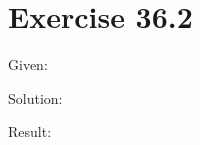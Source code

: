 \documentclass[a4paper, 10pt]{scrartcl}
\begin{document}
\section{Exercise 36.2}

Given:

Solution:

Result:
\end{document}
